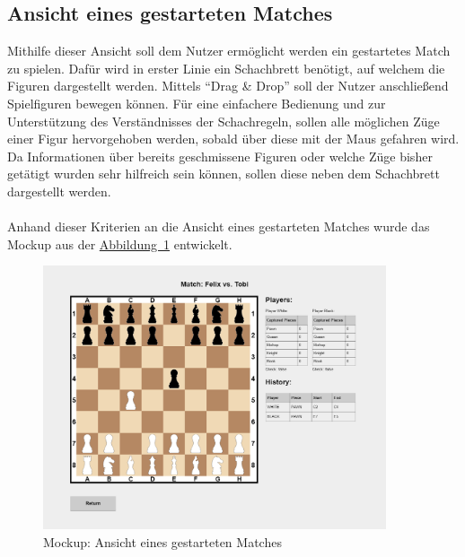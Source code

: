 \subsection{Ansicht eines gestarteten Matches}\label{sec:gameView}
Mithilfe dieser Ansicht soll dem Nutzer ermöglicht werden ein gestartetes Match zu spielen. Dafür wird in erster Linie ein Schachbrett benötigt, auf welchem die Figuren dargestellt werden. Mittels \enquote{Drag \& Drop} soll der Nutzer anschließend Spielfiguren bewegen können. Für eine einfachere Bedienung und zur Unterstützung des Verständnisses der Schachregeln, sollen alle möglichen Züge einer Figur hervorgehoben werden, sobald über diese mit der Maus gefahren wird. Da Informationen über bereits geschmissene Figuren oder welche Züge bisher getätigt wurden sehr hilfreich sein können, sollen diese neben dem Schachbrett dargestellt werden. \\
\\
Anhand dieser Kriterien an die Ansicht eines gestarteten Matches wurde das Mockup aus der \hyperref[fig:gameView]{Abbildung~\ref{fig:gameView}} entwickelt.
\begin{figure}[htb]
	\includegraphics[width=0.9\textwidth]{images/game-view.png}
	\caption{Mockup: Ansicht eines gestarteten Matches}
	\label{fig:gameView}
\end{figure}


